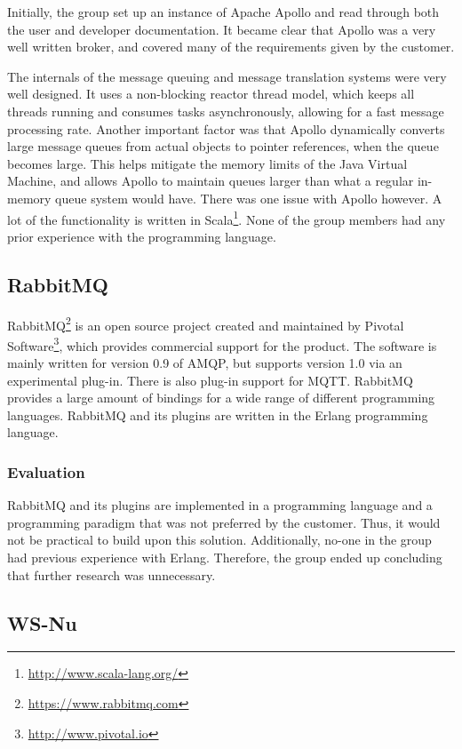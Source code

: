 Initially, the group set up an instance of Apache Apollo and read through both the user and developer documentation. It became clear that Apollo was a very well written broker, and covered many of the requirements given by the customer.

The internals of the message queuing and message translation systems were very well designed. It uses a non-blocking reactor thread model, which keeps all threads running and consumes tasks asynchronously, allowing for a fast message processing rate. Another important factor was that Apollo dynamically converts large message queues from actual objects to pointer references, when the queue becomes large. This helps mitigate the memory limits of the Java Virtual Machine, and allows Apollo to maintain queues larger than what a regular in-memory queue system would have. There was one issue with Apollo however. A lot of the functionality is written in Scala\footnote{\url{http://www.scala-lang.org/}}. None of the group members had any prior experience with the programming language.

\subsection{RabbitMQ}

RabbitMQ\footnote{\url{https://www.rabbitmq.com}} is an open source project created and maintained by Pivotal Software\footnote{\url{http://www.pivotal.io}}, which provides commercial support for the product. The software is mainly written for version 0.9 of AMQP, but supports version 1.0 via an experimental plug-in. There is also plug-in support for MQTT. RabbitMQ provides a large amount of bindings for a wide range of different programming languages. RabbitMQ and its plugins are written in the Erlang programming language.

\subsubsection{Evaluation}

RabbitMQ and its plugins are implemented in a programming language and a programming paradigm that was not preferred by the customer. Thus, it would not be practical to build upon this solution. Additionally, no-one in the group had previous experience with Erlang. Therefore, the group ended up concluding that further research was unnecessary.

\subsection{WS-Nu}

